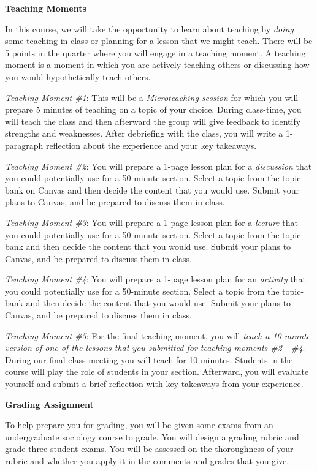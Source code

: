 \documentclass[11pt,]{article}
\begin{document}
\textbf{Teaching Moments}

In this course, we will take the opportunity to learn about teaching by
\emph{doing} some teaching in-class or planning for a lesson that we
might teach. There will be 5 points in the quarter where you will engage
in a teaching moment. A teaching moment is a moment in which you are
actively teaching others or discussing how you would hypothetically
teach others.

\emph{Teaching Moment \#1}: This will be a \emph{Microteaching session}
for which you will prepare 5 minutes of teaching on a topic of your
choice. During class-time, you will teach the class and then afterward
the group will give feedback to identify strengths and weaknesses. After
debriefing with the class, you will write a 1-paragraph reflection about
the experience and your key takeaways.

\emph{Teaching Moment \#2}: You will prepare a 1-page lesson plan for a
\emph{discussion} that you could potentially use for a 50-minute
section. Select a topic from the topic-bank on Canvas and then decide
the content that you would use. Submit your plans to Canvas, and be
prepared to discuss them in class.

\emph{Teaching Moment \#3}: You will prepare a 1-page lesson plan for a
\emph{lecture} that you could potentially use for a 50-minute section.
Select a topic from the topic-bank and then decide the content that you
would use. Submit your plans to Canvas, and be prepared to discuss them
in class.

\emph{Teaching Moment \#4}: You will prepare a 1-page lesson plan for an
\emph{activity} that you could potentially use for a 50-minute section.
Select a topic from the topic-bank and then decide the content that you
would use. Submit your plans to Canvas, and be prepared to discuss them
in class.

\emph{Teaching Moment \#5}: For the final teaching moment, you will
\emph{teach a 10-minute version of one of the lessons that you submitted
for teaching moments \#2 - \#4}. During our final class meeting you will
teach for 10 minutes. Students in the course will play the role of
students in your section. Afterward, you will evaluate yourself and
submit a brief reflection with key takeaways from your experience.

\textbf{Grading Assignment}

To help prepare you for grading, you will be given some exams from an
undergraduate sociology course to grade. You will design a grading
rubric and grade three student exams. You will be assessed on the
thoroughness of your rubric and whether you apply it in the comments and
grades that you give.
\end{document}
